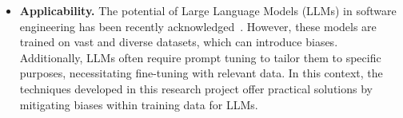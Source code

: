 \begin{itemize}


	
	\item \textbf{Applicability.} The potential of Large Language Models (LLMs) in software engineering has been recently acknowledged~\cite{10109345}. However, these models are trained on vast and diverse datasets, which can introduce biases. Additionally, LLMs often require prompt tuning to tailor them to specific purposes, necessitating fine-tuning with relevant data. 
	In this context, the techniques developed in this research project offer practical solutions by mitigating biases within training data for LLMs. %
	

\end{itemize}
